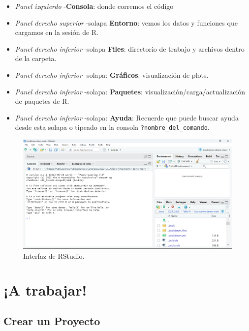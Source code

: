 \documentclass[
]{book}
\providecommand{\tightlist}{%
  \setlength{\itemsep}{0pt}\setlength{\parskip}{0pt}}
\begin{document}
\begin{itemize}
\tightlist
\item
  \emph{Panel izquierdo} -\textbf{Consola}: donde corremos el código
\item
  \emph{Panel derecho superior} -solapa \textbf{Entorno}: vemos los datos y funciones que cargamos en la sesión de R.
\item
  \emph{Panel derecho inferior} -solapa \textbf{Files}: directorio de trabajo y archivos dentro de la carpeta.
\item
  \emph{Panel derecho inferior} -solapa: \textbf{Gráficos}: visualización de plots.
\item
  \emph{Panel derecho inferior} -solapa: \textbf{Paquetes}: visualización/carga/actualización de paquetes de R.
\item
  \emph{Panel derecho inferior} -solapa: \textbf{Ayuda}: Recuerde que puede buscar ayuda desde esta solapa o tipeado en la consola \texttt{?nombre\_del\_comando}.
\end{itemize}

\begin{figure}

{\centering \includegraphics[width=1\linewidth]{./images/rstudio} 

}

\caption{Interfaz de RStudio.}\label{fig:rstudio}
\end{figure}

\hypertarget{a-trabajar}{%
\section{¡A trabajar!}\label{a-trabajar}}

\hypertarget{crear-un-proyecto}{%
\subsection{\texorpdfstring{Crear un \textbf{Proyecto}}{Crear un Proyecto}}\label{crear-un-proyecto}}
\end{document}
